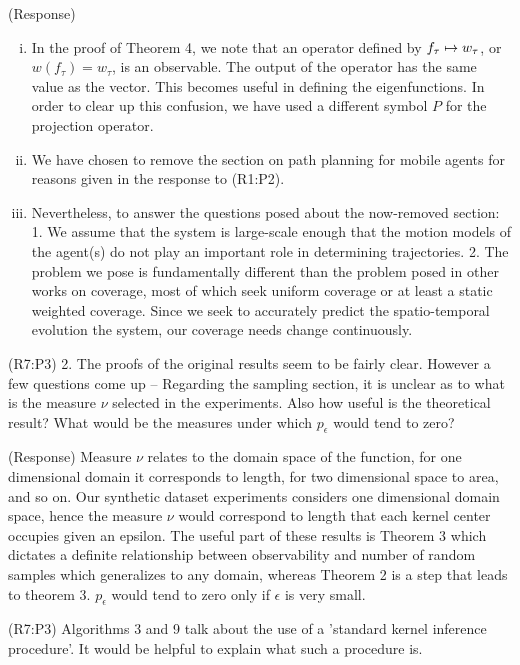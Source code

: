 \documentclass{letter}
\begin{document}
{\color{red}(Response)}
\begin{enumerate}[(i)]
	\item In the proof of Theorem 4, we note that an operator defined by $f_{\tau} \mapsto w_{\tau}$, or $w(f_{\tau})=w_{\tau}$, is an observable. The output of the operator has the same value as the vector. This becomes useful in defining the eigenfunctions. In order to clear up this confusion, we have used a different symbol $P$ for the projection operator.
	\item We have chosen to remove the section on path planning for mobile agents for reasons given in the response to {\color{red}(R1:P2)}.
	\item Nevertheless, to answer the questions posed about the now-removed section: 1. We assume that the system is large-scale enough that the motion models of the agent(s) do not play an important role in determining trajectories. 2. The problem we pose is fundamentally different than the problem posed in other works on coverage, most of which seek uniform coverage or at least a static weighted coverage. Since we seek to accurately predict the spatio-temporal evolution the system, our coverage needs change continuously.
\end{enumerate}


{\color{red}(R7:P3)} 2. The proofs of the original results seem to be fairly clear. However a few questions come up -- Regarding the sampling section, it is
unclear as to what is the measure $\nu$ selected in the experiments. Also how useful is the theoretical result? What would be the measures under which $p_\epsilon$ would tend to zero?  


{\color{red}(Response)} Measure $ \nu $ relates to the domain space of the function, for one dimensional domain it corresponds to length, for two dimensional space to area, and so on. Our synthetic dataset experiments considers one dimensional domain space, hence the measure $ \nu $ would correspond to length that each kernel center occupies given an epsilon. The useful part of these results is Theorem 3 which dictates a definite relationship between observability and number of random samples which generalizes to any domain, whereas Theorem 2 is a step that leads to theorem 3. $p_\epsilon$ would tend to zero only if $ \epsilon $ is very small.

{\color{red}(R7:P3)} Algorithms 3 and 9 talk about the use of a 'standard kernel inference procedure'. It would be helpful to explain what such a procedure is.
\end{document}
